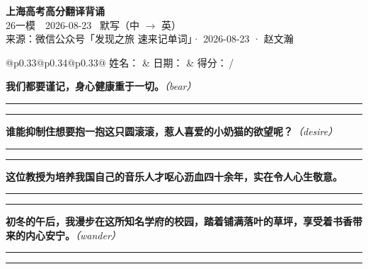 \documentclass[11pt,a4paper]{article}
\newcommand{\num}[1]{\makebox[1.9em][r]{#1.}\hspace{0.3em}}
\newcommand{\wline}{\noindent\rule{\linewidth}{0.4pt}}
\newcommand{\prompt}[1]{\emph{\textcolor{tipblue}{\small（#1）}}}
\begin{document}
\pagestyle{plain}
\begin{center}
{\LARGE\bfseries 上海高考高分翻译背诵 }\\[0.25em]
{\large 26一模　2026-08-23 \quad\ 默写（中 $\to$ 英）}\\[0.35em]
{\footnotesize 来源：微信公众号「发现之旅 速来记单词」· 2026-08-23 · 赵文瀚}
\end{center}

\vspace{0.4em}
\noindent\begin{tabular}{@{}p{0.33\textwidth}@{}p{0.34\textwidth}@{}p{0.33\textwidth}@{}}
姓名：\underline{\hspace{2.0cm}} & 日期：\underline{\hspace{2.0cm}} & 得分：\underline{\hspace{1.4cm}}\,/ \\
\end{tabular}

\vspace{0.5em}

\vspace{0.8em}
\num{1}\textbf{我们都要谨记，身心健康重于一切。}\prompt{bear}

\vspace{0.3em}

\wline\vspace{0.3em}
\wline

\num{2}\textbf{谁能抑制住想要抱一抱这只圆滚滚，惹人喜爱的小奶猫的欲望呢？}\prompt{desire}

\vspace{0.3em}

\wline\vspace{0.3em}
\wline

\num{3}\textbf{这位教授为培养我国自己的音乐人才呕心沥血四十余年，实在令人心生敬意。}

\vspace{0.3em}

\wline\vspace{0.3em}
\wline

\num{4}\textbf{初冬的午后，我漫步在这所知名学府的校园，踏着铺满落叶的草坪，享受着书香带来的内心安宁。}\prompt{wander}

\vspace{0.3em}

\wline\vspace{0.3em}
\wline
\end{document}

